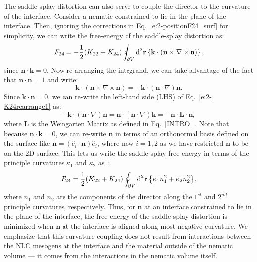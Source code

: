 The saddle-splay distortion can also serve to couple the director to the curvature of the interface.
Consider a nematic constrained to lie in the plane of the interface.
Then, ignoring the corrections in Eq.~\ref{e:2-positionF24_surf} for simplicity, we can write the free-energy of the saddle-splay distortion as:
\begin{equation}
  F_{24} = -\frac{1}{2}(K_{22} + K_{24})
  \oint_{\partial V}\textup{d}^2 \mathbf{r} \left \{\mathbf{k} \cdot ( \mathbf{n} \times \nabla \times \mathbf{n}) \right \},\label{e:2-K24PlanDegen}
\end{equation}
since $\mathbf{n} \cdot \mathbf{k} = 0$. Now re-arranging the integrand, we can take advantage of the fact that $\mathbf{n} \cdot \mathbf{n}=1$ and write:
\begin{equation}
  \mathbf{k} \cdot ( \mathbf{n} \times \nabla \times \mathbf{n}) = -\mathbf{k} \cdot (\mathbf{n} \cdot \nabla)\mathbf{n}.\label{e:2-K24rearrange1}
\end{equation}
Since $\mathbf{k} \cdot \mathbf{n} = 0$, we can re-write the left-hand side (LHS) of Eq.~\ref{e:2-K24rearrange1} as:
\begin{equation}
  -\mathbf{k} \cdot (\mathbf{n} \cdot \nabla)\mathbf{n} = \mathbf{n} \cdot (\mathbf{n} \cdot \nabla)\mathbf{k} = -\mathbf{n} \cdot \mathbf{L} \cdot \mathbf{n},\label{e:2-K24rearrange2}
\end{equation}
where $\mathbf{L}$ is the Weingarten Matrix as defined in Eq.~[INTRO]~\cite{RN23,RN35}.
Note that because $\mathbf{n} \cdot \mathbf{k}=0$, we can re-write $\mathbf{n}$ in terms of an orthonormal basis defined on the surface like $\mathbf{n} = (\hat{e}_i \cdot \mathbf{n})\hat{e}_i$, where now $i = 1,2$ as we have restricted $\mathbf{n}$ to be on the 2D surface.
This lets us write the saddle-splay free energy in terms of the principle curvatures $\kappa_1$ and $\kappa_2$ as~\cite{RN59}:
\begin{equation}
  F_{24} = \frac{1}{2}(K_{22} + K_{24})
  \oint_{\partial V}\textup{d}^2 \mathbf{r} \left \{\kappa_1 n_1^2 + \kappa_2 n_2^2 \right \},\label{e:2-K24SurfCouple}
\end{equation}
where $n_1$ and $n_2$ are the components of the director along the $1^{st}$ and $2^{nd}$ principle curvatures, respectively.
Thus, for $\mathbf{n}$ at an interface constrained to lie in the plane of  the interface, the free-energy of the saddle-splay distortion is minimized when $\mathbf{n}$ at the interface is aligned along most negative curvature.
We emphasize that this curvature-coupling does not result from interactions between the NLC mesogens at the interface and the material outside of the nematic volume --- it comes from the interactions in the nematic volume itself.




